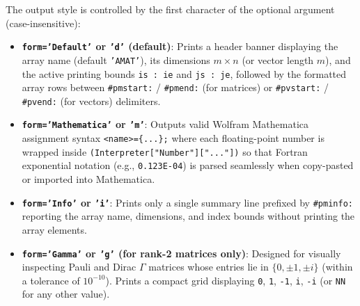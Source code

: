 The output style is controlled by the first character of the optional argument  (case-insensitive):
\begin{itemize}
  \item \textbf{\texttt{form='Default'} or \texttt{'d'} (default)}:
  Prints a header banner displaying the array name (default \texttt{'AMAT'}), its dimensions $m\times n$ (or vector length $m$), and the active printing bounds \texttt{is : ie} and \texttt{js : je}, followed by the formatted array rows between \texttt{\#pmstart:} / \texttt{\#pmend:} (for matrices) or \texttt{\#pvstart:} / \texttt{\#pvend:} (for vectors) delimiters.
  \item \textbf{\texttt{form='Mathematica'} or \texttt{'m'}}:
  Outputs valid Wolfram Mathematica assignment syntax \texttt{<name>=\{...\};} where each floating-point number is wrapped inside \texttt{(Interpreter["Number"]["..."])} so that Fortran exponential notation (e.g., \texttt{0.123E-04}) is parsed seamlessly when copy-pasted or imported into Mathematica.
  \item \textbf{\texttt{form='Info'} or \texttt{'i'}}:
  Prints only a single summary line prefixed by \texttt{\#pminfo:} reporting the array name, dimensions, and index bounds without printing the array elements.
  \item \textbf{\texttt{form='Gamma'} or \texttt{'g'} (for rank-2  matrices only)}:
  Designed for visually inspecting Pauli and Dirac $\Gamma$ matrices whose entries lie in $\{0, \pm 1, \pm i\}$ (within a tolerance of $10^{-10}$). Prints a compact grid displaying \texttt{0}, \texttt{1}, \texttt{-1}, \texttt{i}, \texttt{-i} (or \texttt{NN} for any other value).
\end{itemize}

\begin{description}[leftmargin=2.2cm, style=nextline]
\end{description}

